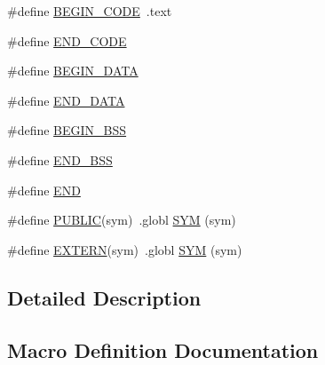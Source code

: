 \begin{DoxyCompactItemize}
\item 
\#define \mbox{\hyperlink{group__RTEMSScoreCPUExampleASM_ga6d6dc213aff5b736968e2aff37eb2c99}{B\+E\+G\+I\+N\+\_\+\+C\+O\+DE}}~.text
\item 
\#define \mbox{\hyperlink{group__RTEMSScoreCPUExampleASM_gaac423acb743520558daf6a94e1e34534}{E\+N\+D\+\_\+\+C\+O\+DE}}
\item 
\#define \mbox{\hyperlink{group__RTEMSScoreCPUExampleASM_ga93fba2b033eb50ec004405c59faaa824}{B\+E\+G\+I\+N\+\_\+\+D\+A\+TA}}
\item 
\#define \mbox{\hyperlink{group__RTEMSScoreCPUExampleASM_gab989978585b78e98ff314e8abb5f9bb0}{E\+N\+D\+\_\+\+D\+A\+TA}}
\item 
\#define \mbox{\hyperlink{group__RTEMSScoreCPUExampleASM_ga50f110f0489e48ceda4a0473a35d2978}{B\+E\+G\+I\+N\+\_\+\+B\+SS}}
\item 
\#define \mbox{\hyperlink{group__RTEMSScoreCPUExampleASM_gae8acdd1ba8aa625ce8a829773fd512e2}{E\+N\+D\+\_\+\+B\+SS}}
\item 
\#define \mbox{\hyperlink{group__RTEMSScoreCPUExampleASM_ga29fd18bed01c4d836c7ebfe73a125c3f}{E\+ND}}
\item 
\#define \mbox{\hyperlink{group__RTEMSScoreCPUExampleASM_ga5e536c0e80cb78da6a74541281111e40}{P\+U\+B\+L\+IC}}(sym)~.globl \mbox{\hyperlink{group__RTEMSScoreCPUx86-64ASM_gafe05d428a5f345f51fb591debb815325}{S\+YM}} (sym)
\item 
\#define \mbox{\hyperlink{group__RTEMSScoreCPUExampleASM_ga9808b867f8d1bd54d78548a5cd5dc415}{E\+X\+T\+E\+RN}}(sym)~.globl \mbox{\hyperlink{group__RTEMSScoreCPUx86-64ASM_gafe05d428a5f345f51fb591debb815325}{S\+YM}} (sym)
\end{DoxyCompactItemize}


\subsection{Detailed Description}


\subsection{Macro Definition Documentation}
\mbox{\label{group__RTEMSScoreCPUExampleASM_ga08d4062230ffc8494f4be4f6447497e4}} 
